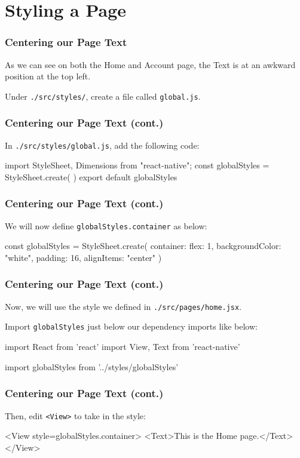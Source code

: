 \documentclass{beamer}
\begin{document}
  \section{Styling a Page}
  \begin{frame}[fragile]
    \frametitle{Centering our Page Text}

    As we can see on both the Home and Account page, the Text is at an awkward position at the top left. 

    Under \verb|./src/styles/|, create a file called \verb|global.js|.
  \end{frame}
  \begin{frame}[fragile]
    \frametitle{Centering our Page Text (cont.)}

    In \verb|./src/styles/global.js|, add the following code: 

    \begin{jscode}
import { StyleSheet, Dimensions } from "react-native";
const globalStyles = StyleSheet.create({
})
export default globalStyles
    \end{jscode}
  \end{frame}
  \begin{frame}[fragile]
    \frametitle{Centering our Page Text (cont.)}

    We will now define \verb|globalStyles.container| as below:

    \begin{jscodesmall}
const globalStyles = StyleSheet.create({
  container: {
    flex: 1,
    backgroundColor: "white",
    padding: 16,
    alignItems: "center"
  }
})
    \end{jscodesmall}
  \end{frame}
  \begin{frame}[fragile]
    \frametitle{Centering our Page Text (cont.)}

    Now, we will use the style we defined in \verb|./src/pages/home.jsx|.

    Import \verb|globalStyles| just below our dependency imports like below: 

    \begin{jscodesmall}
import React from 'react'
import {View, Text} from 'react-native'

import globalStyles from '../styles/globalStyles'
    \end{jscodesmall}
  \end{frame}
  \begin{frame}[fragile]
    \frametitle{Centering our Page Text (cont.)}

    Then, edit \verb|<View>| to take in the style:

    \begin{jscodesmall}
<View style={globalStyles.container}>
  <Text>This is the Home page.</Text>
</View>
    \end{jscodesmall}
  \end{frame}
\end{document}

